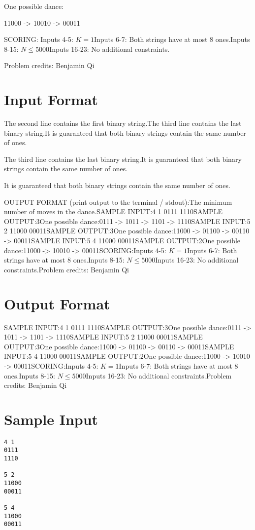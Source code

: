 \documentclass[12pt]{article}
\begin{document}
One possible dance:


11000 -> 10010 -> 00011

SCORING:
Inputs 4-5: $K=1$Inputs 6-7: Both strings have at most $8$ ones.Inputs 8-15: $N\le 5000$Inputs 16-23: No additional constraints.


Problem credits: Benjamin Qi



\section*{Input Format}
The second line contains the first binary string.The third line contains the last binary string.It is guaranteed that both binary strings contain the same number of ones.

The third line contains the last binary string.It is guaranteed that both binary strings contain the same number of ones.

It is guaranteed that both binary strings contain the same number of ones.

OUTPUT FORMAT (print output to the terminal / stdout):The minimum number of moves in the dance.SAMPLE INPUT:4 1
0111
1110SAMPLE OUTPUT:3One possible dance:0111 -> 1011 -> 1101 -> 1110SAMPLE INPUT:5 2
11000
00011SAMPLE OUTPUT:3One possible dance:11000 -> 01100 -> 00110 -> 00011SAMPLE INPUT:5 4
11000
00011SAMPLE OUTPUT:2One possible dance:11000 -> 10010 -> 00011SCORING:Inputs 4-5: $K=1$Inputs 6-7: Both strings have at most $8$ ones.Inputs 8-15: $N\le 5000$Inputs 16-23: No additional constraints.Problem credits: Benjamin Qi

\section*{Output Format}
SAMPLE INPUT:4 1
0111
1110SAMPLE OUTPUT:3One possible dance:0111 -> 1011 -> 1101 -> 1110SAMPLE INPUT:5 2
11000
00011SAMPLE OUTPUT:3One possible dance:11000 -> 01100 -> 00110 -> 00011SAMPLE INPUT:5 4
11000
00011SAMPLE OUTPUT:2One possible dance:11000 -> 10010 -> 00011SCORING:Inputs 4-5: $K=1$Inputs 6-7: Both strings have at most $8$ ones.Inputs 8-15: $N\le 5000$Inputs 16-23: No additional constraints.Problem credits: Benjamin Qi

\section*{Sample Input}
\begin{verbatim}
4 1
0111
1110

5 2
11000
00011

5 4
11000
00011
\end{verbatim}
\end{document}
